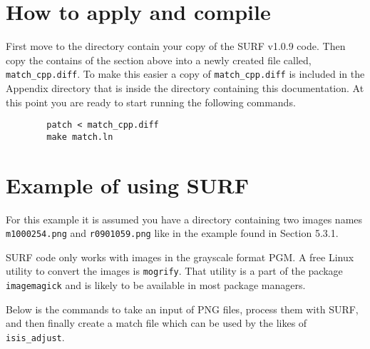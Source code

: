 \section{How to apply and compile}

First move to the directory contain your copy of the SURF v1.0.9
code. Then copy the contains of the section above into a newly created
file called, \verb=match_cpp.diff=. To make this easier a copy of
\verb=match_cpp.diff= is included in the Appendix directory that is
inside the directory containing this documentation. At this point you
are ready to start running the following commands.

\begin{verbatim}
        patch < match_cpp.diff
        make match.ln
\end{verbatim}

\begin{center}
\end{center}

\section{Example of using SURF}

For this example it is assumed you have a directory containing two
images names \verb=m1000254.png= and \verb=r0901059.png= like in the
example found in Section 5.3.1.

SURF code only works with images in the grayscale format PGM. A free
Linux utility to convert the images is \texttt{mogrify}. That utility
is a part of the package \texttt{imagemagick} and is likely to be
available in most package managers.

Below is the commands to take an input of PNG files, process them with
SURF, and then finally create a match file which can be used by the
likes of \texttt{isis\_adjust}.

